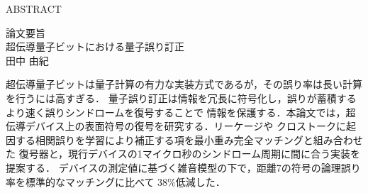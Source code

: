 \thispagestyle{empty}
\begin{center}{\large ABSTRACT}\end{center}

\vspace{24pt}
\begin{center}{\large 論文要旨}\\[6pt]超伝導量子ビットにおける量子誤り訂正\\田中 由紀\end{center}
超伝導量子ビットは量子計算の有力な実装方式であるが，その誤り率は長い計算を行うには高すぎる．
量子誤り訂正は情報を冗長に符号化し，誤りが蓄積するより速く誤りシンドロームを復号することで
情報を保護する．本論文では，超伝導デバイス上の表面符号の復号を研究する．リーケージや
クロストークに起因する相関誤りを学習により補正する項を最小重み完全マッチングと組み合わせた
復号器と，現行デバイスの1マイクロ秒のシンドローム周期に間に合う実装を提案する．
デバイスの測定値に基づく雑音模型の下で，距離7の符号の論理誤り率を標準的なマッチングに比べて
38\%低減した．
\clearpage
